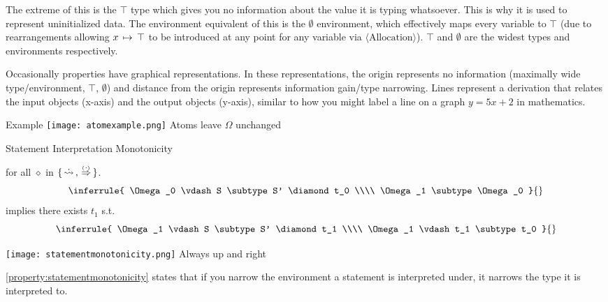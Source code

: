 \documentclass[12pt,twoside]{report}
\begin{document}
The extreme of this is the $\top$ type which gives you no information about the value it is typing whatsoever. This is why it is used to represent uninitialized data. The environment equivalent of this is the $\emptyset$ environment, which effectively maps every variable to $\top$ (due to rearrangements allowing $x \, \mapsto \, \top$ to be introduced at any point for any variable via $\langle\text{Allocation}\rangle$). $\top$ and $\emptyset$ are the widest types and environments respectively.

\noindent
\begin{minipage}{0.6\textwidth}
  \hspace{2.25ex} Occasionally properties have graphical representations. In these representations, the origin represents no information (maximally wide type/environment, $\top$, $\emptyset$) and distance from the origin represents information gain/type narrowing. Lines represent a derivation that relates the input objects (x-axis) and the output objects (y-axis), similar to how you might label a line on a graph $y = 5x + 2$ in mathematics.
\end{minipage}
\begin{minipage}{0.4\textwidth}
  \centering
  Example
  \texttt{[image: atomexample.png]}
  Atoms leave $\Omega$ unchanged
\end{minipage}

\begin{Property}{Statement Interpretation Monotonicity}{}
  \begin{minipage}{0.6\textwidth}
    \centering
    for all $\diamond$ in $\{ \,\dot{\rightsquigarrow}\,, \,\stackrel{_(._)}{\Rightarrow}\, \}$.
    \[\inferrule{
      \Omega_0 \vdash S \subtype S' \diamond t_0 \\\\
      \Omega_1 \subtype \Omega_0
    }{}\]
    implies there exists $t_1$ s.t.
    \[\inferrule{
      \Omega_1 \vdash S \subtype S' \diamond t_1 \\\\
      \Omega_1 \vdash t_1 \subtype t_0
    }{}\]
  \end{minipage}
  \begin{minipage}{0.3\textwidth}
    \centering
    \texttt{[image: statementmonotonicity.png]}
    Always up and right
  \end{minipage}
\end{Property}
\label{property:statementmonotonicity}

\ref{property:statementmonotonicity} states that if you narrow the environment a statement is interpreted under, it narrows the type it is interpreted to.
\end{document}
